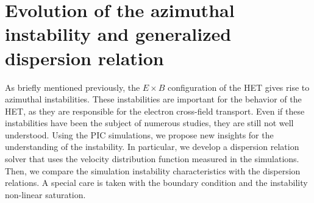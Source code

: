 



\chapter{Evolution of the azimuthal instability and generalized dispersion relation}
\label{ch-5}



\begin{Chabstract}
  
As briefly mentioned previously, the $E \times B$ configuration of the \ac{HET} gives rise to azimuthal instabilities.
These instabilities are important for the behavior of the \ac{HET}, as they are responsible for the electron cross-field transport.
Even if these instabilities have been the subject of numerous studies, they are still not well understood.
Using the \ac{PIC} simulations, we propose new insights for the understanding of the instability.
In particular, we develop a dispersion relation solver that uses the velocity distribution function measured in the simulations.
Then, we compare the simulation instability characteristics with the dispersion relations.
A special care is taken with the boundary condition and the instability non-linear saturation.
\end{Chabstract}

% 
% 

\minitoc








